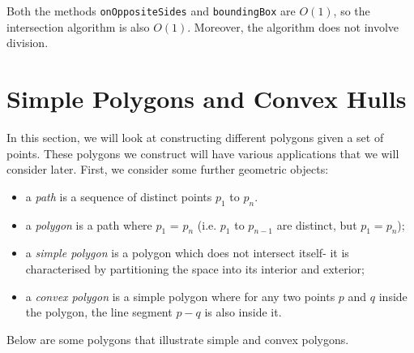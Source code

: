\documentclass[a4paper, openany]{memoir}
\begin{document}
Both the methods \texttt{onOppositeSides} and \texttt{boundingBox} are $O(1)$, so the intersection algorithm is also $O(1)$. Moreover, the algorithm does not involve division.

\newpage

\section{Simple Polygons and Convex Hulls}
In this section, we will look at constructing different polygons given a set of points. These polygons we construct will have various applications that we will consider later. First, we consider some further geometric objects:
\begin{itemize}
    \item a \emph{path} is a sequence of distinct points $p_1$ to $p_n$.
    \item a \emph{polygon} is a path where $p_1$ = $p_n$ (i.e. $p_1$ to $p_{n-1}$ are distinct, but $p_1 = p_n$);
    \item a \emph{simple polygon} is a polygon which does not intersect itself- it is characterised by partitioning the space into its interior and exterior;
    \item a \emph{convex polygon} is a simple polygon where for any two points $p$ and $q$ inside the polygon, the line segment $p-q$ is also inside it.
\end{itemize}
Below are some polygons that illustrate simple and convex polygons.
\end{document}
